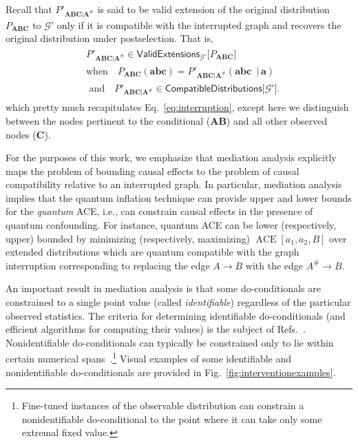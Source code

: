 \documentclass[superscriptaddress,aps,prx,nofootinbib,twocolumn,twoside,reprint,letterpaper,longbibliography]{revtex4-2}
\begin{document}
Recall that $P'_{\boldsymbol{ABC}\vert\boldsymbol{A}^\#}$ is said to be valid extension of the original distribution $P_{\boldsymbol{ABC}}$ to $\mathcal{G}'$ only if it is compatible with the interrupted graph and recovers the original distribution under postselection. That is,
\begin{align}\begin{split}
&{P'_{\boldsymbol{ABC}\vert\boldsymbol{A}^\#} \in \textsf{ValidExtensions}_{\mathcal{G'}}\big[P_{\boldsymbol{ABC}}\big]}\\
&\text{when}\quad{P_{\boldsymbol{ABC}}(\boldsymbol{abc})=P'_{\boldsymbol{ABC}\vert\boldsymbol{A}^\#}(\boldsymbol{abc} \;\;\vert\,\boldsymbol{a})}\\
&\text{ and}\quad{P'_{\boldsymbol{A}\boldsymbol{B}\boldsymbol{C}\vert\boldsymbol{A}^\#}\in \textsf{CompatibleDistributions}\big[\mathcal{G'}\big]}.
\end{split}\label{eq:mediation}
\end{align}
which pretty much recapitulates Eq.~\eqref{eq:interruption}, except here we distinguish between the nodes pertinent to the conditional ($\boldsymbol{AB}$) and all other observed nodes ($\boldsymbol{C}$).

For the purposes of this work, we emphasize that mediation analysis explicitly maps the problem of bounding causal effects to the problem of causal compatibility relative to an interrupted graph. In particular, mediation analysis implies that the quantum inflation technique can provide upper and lower bounds for the \emph{quantum} ACE, i.e., can constrain causal effects in the presence of quantum confounding. For instance, quantum ACE can be lower (respectively, upper) bounded by minimizing (respectively, maximizing) ${{\operatorname{ACE}}[a_1,a_2,B]}$ over extended distributions which are quantum compatible with the graph interruption corresponding to replacing the edge $A\to B$ with the edge ${A^\#{\to} B}$.

An important result in mediation analysis is that some do-conditionals are constrained to a single point value (called \emph{identifiable}) regardless of the particular observed statistics. The criteria for determining identifiable do-conditionals (and efficient algorithms for computing their values) is the subject of Refs.~\cite{shpitser2016,shpitser2018identification,stensrud2019separable,malinsky2019potential,bhattacharya2020semiparametric}.
Nonidentifiable do-conditionals can typically be constrained only to lie within certain numerical spans~\cite{Cai2007,kang2012inequality,miles2015partial}.\footnote{Fine-tuned instances of the observable distribution can constrain a nonidentifiable do-conditional to the point where it can take only some extremal fixed value.} Visual examples of some identifiable and nonidentifiable do-conditionals are provided in Fig.~\ref{fig:interventionexamples}.
\end{document}
